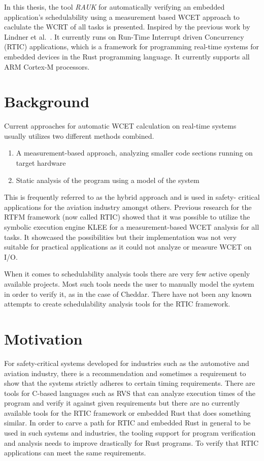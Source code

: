 In this thesis, the tool \emph{RAUK} for automatically verifying an embedded
application's schedulability using a measurement based WCET approach to
caclulate the WCRT of all tasks is presented. Inspired by the previous work by
Lindner et al.\ \cite{lindner}. It currently runs on Run-Time Interrupt driven
Concurrency (RTIC) applications, which is a framework for programming real-time
systems for embedded devices in the Rust programming language. It currently
supports all ARM Cortex-M processors.

\section{Background}
Current approaches for automatic WCET calculation on real-time systems usually
utilizes two different methods combined.
\begin{enumerate}
    \item A measurement-based approach, analyzing smaller code sections running
        on target hardware
    \item Static analysis of the program using a model of the system
\end{enumerate}
This is frequently referred to as the hybrid approach and is used in safety-
critical applications for the aviation industry\cite{rapita} amongst others.
Previous research for the RTFM framework (now called RTIC) showed that it was
possible to utilize the symbolic execution engine KLEE for a measurement-based
WCET analysis for all tasks\cite{lindner}. It showcased the possibilities but
their implementation was not very suitable for practical applications as it
could not analyze or measure WCET on I/O.

When it comes to schedulability analysis tools there are very few active openly
available projects. Most such tools needs the user to manually model the system
in order to verify it, as in the case of Cheddar\cite{cheddar}. There have not
been any known attempts to create schedulability analysis tools for the RTIC
framework.

\section{Motivation}
For safety-critical systems developed for industries such as the automotive and
aviation industry, there is a recommendation and sometimes a requirement to
show that the systems strictly adheres to certain timing requirements. There
are tools for C-based languages such as RVS\cite{rapita} that can analyze
execution times of the program and verify it against given requirements but
there are no currently available tools for the RTIC framework or embedded Rust
that does something similar. In order to carve a path for RTIC and embedded
Rust in general to be used in such systems and industries, the tooling support
for program verification and analysis needs to improve drastically for Rust
programs. To verify that RTIC applications can meet the same requirements.

